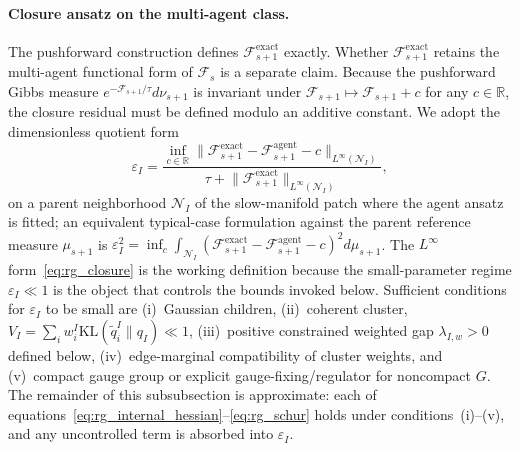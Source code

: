 \documentclass[11pt]{article}
\begin{document}
\paragraph{Closure ansatz on the multi-agent class.}
The pushforward construction defines $\mathcal{F}^{\mathrm{exact}}_{s+1}$ exactly. Whether $\mathcal{F}^{\mathrm{exact}}_{s+1}$ retains the multi-agent functional form of $\mathcal{F}_s$ is a separate claim. Because the pushforward Gibbs measure $e^{-\mathcal{F}_{s+1}/\tau} d\nu_{s+1}$ is invariant under $\mathcal{F}_{s+1} \mapsto \mathcal{F}_{s+1} + c$ for any $c \in \mathbb{R}$, the closure residual must be defined modulo an additive constant. We adopt the dimensionless quotient form
\begin{equation}
\varepsilon_I = \frac{\inf_{c \in \mathbb{R}}\big\|\mathcal{F}^{\mathrm{exact}}_{s+1} - \mathcal{F}^{\mathrm{agent}}_{s+1} - c\big\|_{L^\infty(\mathcal{N}_I)}}{\tau + \big\|\mathcal{F}^{\mathrm{exact}}_{s+1}\big\|_{L^\infty(\mathcal{N}_I)}},
\label{eq:rg_closure}
\end{equation}
on a parent neighborhood $\mathcal{N}_I$ of the slow-manifold patch where the agent ansatz is fitted; an equivalent typical-case formulation against the parent reference measure $\mu_{s+1}$ is $\varepsilon_I^2 = \inf_c \int_{\mathcal{N}_I}(\mathcal{F}^{\mathrm{exact}}_{s+1} - \mathcal{F}^{\mathrm{agent}}_{s+1} - c)^2 d\mu_{s+1}$. The $L^\infty$ form~\eqref{eq:rg_closure} is the working definition because the small-parameter regime $\varepsilon_I \ll 1$ is the object that controls the bounds invoked below. Sufficient conditions for $\varepsilon_I$ to be small are (i)~Gaussian children, (ii)~coherent cluster, $V_I = \sum_i w_i^I \mathrm{KL}(\widetilde{q}_i^I \| q_I) \ll 1$, (iii)~positive constrained weighted gap $\lambda_{I,w} > 0$ defined below, (iv)~edge-marginal compatibility of cluster weights, and (v)~compact gauge group or explicit gauge-fixing/regulator for noncompact $G$. The remainder of this subsubsection is approximate: each of equations~\eqref{eq:rg_internal_hessian}--\eqref{eq:rg_schur} holds under conditions~(i)--(v), and any uncontrolled term is absorbed into $\varepsilon_I$.
\end{document}
